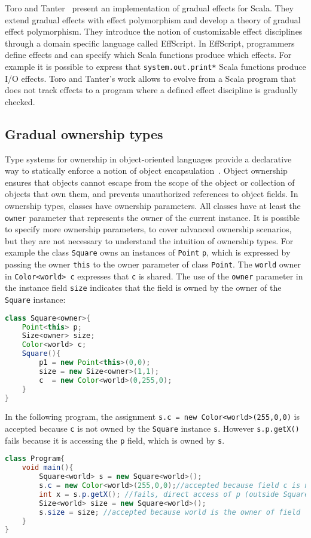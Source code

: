 \documentclass{article}
\newcommand\icode[1]{\texttt{#1}}
\begin{document}
Toro and Tanter~\cite{toroTanter:oopsla2015} present an implementation of gradual effects for Scala. They extend gradual effects with effect polymorphism and develop a theory of gradual effect polymorphism. They introduce the notion of customizable effect disciplines through a domain specific language called EffScript. In EffScript, programmers define effects and can specify which Scala functions produce which effects. For example it is possible to express that \icode{system.out.print*} Scala functions produce I/O effects. Toro and Tanter's work allows to evolve from a Scala program that does not track effects to a program where a defined effect discipline is gradually checked.

\subsection{Gradual ownership types}
Type systems for ownership in object-oriented languages provide a declarative way to statically enforce a notion of object encapsulation~\cite{clarkeAl:oopsla1998,clarkeDrossopoulou:sigplan2002}. Object ownership ensures that objects cannot escape from the scope of the object or collection of objects that own them, and prevents unauthorized references to object fields. In ownership types, classes have ownership parameters. All classes have at least the \icode{owner} parameter that represents the owner of the current instance. It is possible to specify more ownership parameters, to cover advanced ownership scenarios, but they are not necessary to understand the intuition of ownership types. For example the class \icode{Square} owns an instances of \icode{Point} \icode{p}, which is expressed by passing the owner \icode{this} to the owner parameter of class \icode{Point}. The \icode{world} owner in \icode{Color<world> c} expresses that \icode{c} is shared. The use of the \icode{owner} parameter in the instance field \icode{size} indicates that the field is owned by the owner of the \icode{Square} instance:
\begin{lstlisting}[language=Java,tabsize=2]
class Square<owner>{
	Point<this> p;
	Size<owner> size;
	Color<world> c;
	Square(){
		p1 = new Point<this>(0,0);
		size = new Size<owner>(1,1);
		c  = new Color<world>(0,255,0);
	}	
}
\end{lstlisting}
In the following program, the assignment \icode{s.c = new Color<world>(255,0,0)} is accepted because \icode{c} is not owned by the \icode{Square} instance \icode{s}. However \icode{s.p.getX()} fails because it is accessing the \icode{p} field, which is owned by \icode{s}.
\begin{lstlisting}[language=Java,tabsize=2]
class Program{
	void main(){
		Square<world> s = new Square<world>();
		s.c = new Color<world>(255,0,0);//accepted because field c is not owned by Square, it is shared
		int x = s.p.getX(); //fails, direct access of p (outside Square) and p is owned by Square.
		Size<world> size = new Square<world>();
		s.size = size; //accepted because world is the owner of field ``size'' (since it is the owner of ``s'')
	}
}
\end{lstlisting}
\end{document}
